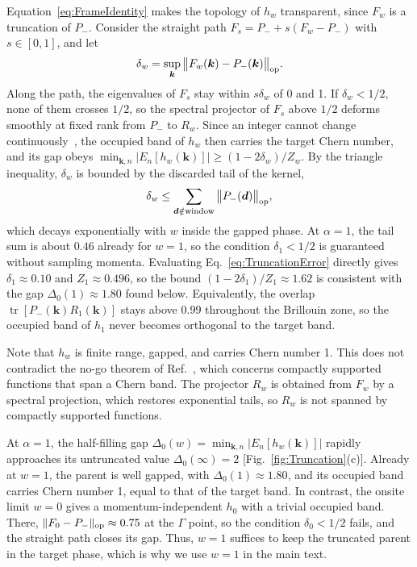 \documentclass[aps,prb,10pt,twocolumn,superscriptaddress,longbibliography,floatfix]{revtex4-2}
\newcommand{\bk}{\boldsymbol k}
\newcommand{\claudeadd}[1]{{\color{orange}#1}}
\begin{document}
{Equation~\eqref{eq:FrameIdentity} makes the topology of $h_w$ transparent, since $F_w$ is a truncation of $P_-$. Consider the straight path $F_s=P_-+s(F_w-P_-)$ with $s\in[0,1]$, and let
\begin{equation}
    \delta_w=\sup_{\bk}\big\|F_w(\bk)-P_-(\bk)\big\|_{\rm op}.
    \label{eq:TruncationError}
\end{equation}
Along the path, the eigenvalues of $F_s$ stay within $s\delta_w$ of 0 and 1. If $\delta_w<1/2$, none of them crosses $1/2$, so the spectral projector of $F_s$ above $1/2$ deforms smoothly at fixed rank from $P_-$ to $R_w$. Since an integer cannot change continuously~\cite{AvronSeilerSimon1983}, the occupied band of $h_w$ then carries the target Chern number, and its gap obeys $\min_{\bk,n}|E_n[h_w(\bk)]|\geq(1-2\delta_w)/Z_w$. By the triangle inequality, $\delta_w$ is bounded by the discarded tail of the kernel,
\begin{equation}
    \delta_w\leq\sum_{\boldsymbol d\notin\text{window}}\big\|P_-(\boldsymbol d)\big\|_{\rm op},
    \label{eq:TailBound}
\end{equation}
which decays exponentially with $w$ inside the gapped phase. At $\alpha=1$, the tail sum is about $0.46$ already for $w=1$, so the condition $\delta_1<1/2$ is guaranteed without sampling momenta. Evaluating Eq.~\eqref{eq:TruncationError} directly gives $\delta_1\approx0.10$ and $Z_1\approx0.496$, so the bound $(1-2\delta_1)/Z_1\approx1.62$ is consistent with the gap $\Delta_0(1)\approx1.80$ found below. Equivalently, the overlap $\operatorname{tr}[P_-(\bk)R_1(\bk)]$ stays above $0.99$ throughout the Brillouin zone, so the occupied band of $h_1$ never becomes orthogonal to the target band.

Note that $h_w$ is finite range, gapped, and carries Chern number 1. This does not contradict the no-go theorem of Ref.~\cite{DubailRead2015}, which concerns compactly supported functions that span a Chern band. The projector $R_w$ is obtained from $F_w$ by a spectral projection, which restores exponential tails, so $R_w$ is not spanned by compactly supported functions.
}

At $\alpha=1$, the half-filling gap $\Delta_0(w)=\min_{\bk,n}|E_n[h_w(\bk)]|$ rapidly approaches its untruncated value $\Delta_0(\infty)=2$ [Fig.~\ref{fig:Truncation}(c)]. Already at $w=1$, the parent is well gapped, with $\Delta_0(1)\approx1.80$, and its occupied band carries Chern number 1, equal to that of the target band. In contrast, the onsite limit $w=0$ gives a momentum-independent $h_0$ with a trivial occupied band. \claudeadd{There, $\|F_0-P_-\|_{\rm op}\approx0.75$ at the $\Gamma$ point, so the condition $\delta_0<1/2$ fails, and the straight path closes its gap.} Thus, $w=1$ suffices to keep the truncated parent in the target phase, which is why we use $w=1$ in the main text.
\end{document}
